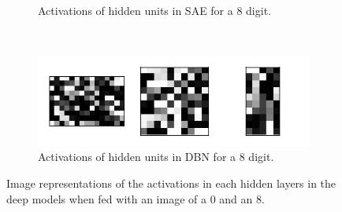 \documentclass{article}
\begin{document}
\begin{figure}[!ht]
\begin{subfigure}[t]{0.47\textwidth}
    \caption{Activations of hidden units in SAE for a 8 digit.}
    \label{fig:saeactivation8}
  \end{subfigure}
  ~
  \begin{subfigure}[t]{0.47\textwidth}
    \centering
    \includegraphics[width=\textwidth]{../plots/3_2_2/dbn_d8_activations.png}
    \caption{Activations of hidden units in DBN for a 8 digit.}
    \label{fig:dbnactivation8}
  \end{subfigure}
  \caption{
    Image representations of the activations in each hidden layers in the deep models
    when fed with an image of a 0 and an 8.
  }
  \label{fig:deepactivations}
\end{figure}
\end{document}
